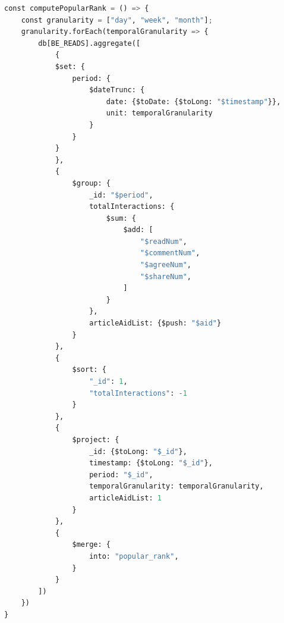 \documentclass{report}
\begin{document}
\begin{lstlisting}[language=python, caption=Aggregation pipeline for generating Popular-Rank table]
const computePopularRank = () => {
    const granularity = ["day", "week", "month"];
    granularity.forEach(temporalGranularity => {
        db[BE_READS].aggregate([
            {
            $set: {
                period: {
                    $dateTrunc: {
                        date: {$toDate: {$toLong: "$timestamp"}},
                        unit: temporalGranularity
                    }
                }
            }
            },
            {
                $group: {
                    _id: "$period",
                    totalInteractions: {
                        $sum: {
                            $add: [
                                "$readNum",
                                "$commentNum",
                                "$agreeNum",
                                "$shareNum",
                            ]
                        }
                    },
                    articleAidList: {$push: "$aid"}
                }
            },
            {
                $sort: {
                    "_id": 1,
                    "totalInteractions": -1
                }
            },
            {
                $project: {
                    _id: {$toLong: "$_id"},
                    timestamp: {$toLong: "$_id"},
                    period: "$_id",
                    temporalGranularity: temporalGranularity,
                    articleAidList: 1
                }
            },
            {
                $merge: {
                    into: "popular_rank",
                }
            }
        ])
    })
}
\end{lstlisting}
\end{document}
